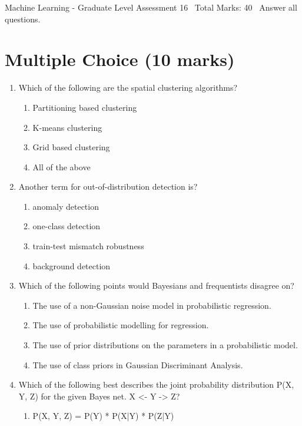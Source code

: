 \documentclass[12pt]{article}
\begin{document}
\begin{center}
Machine Learning - Graduate Level Assessment 16 \
Total Marks: 40 \
Answer all questions.
\end{center}

\section*{Multiple Choice (10 marks)}
\begin{enumerate}[label=\arabic*.]
\item Which of the following are the spatial clustering algorithms?
\begin{enumerate}[label=(\alph*)]
    \item Partitioning based clustering
    \item K-means clustering
    \item Grid based clustering
    \item All of the above
\end{enumerate}
\item Another term for out-of-distribution detection is?
\begin{enumerate}[label=(\alph*)]
    \item anomaly detection
    \item one-class detection
    \item train-test mismatch robustness
    \item background detection
\end{enumerate}
\item Which of the following points would Bayesians and frequentists disagree on?
\begin{enumerate}[label=(\alph*)]
    \item The use of a non-Gaussian noise model in probabilistic regression.
    \item The use of probabilistic modelling for regression.
    \item The use of prior distributions on the parameters in a probabilistic model.
    \item The use of class priors in Gaussian Discriminant Analysis.
\end{enumerate}
\item Which of the following best describes the joint probability distribution P(X, Y, Z) for the given Bayes net. X \textless{}- Y -\textgreater{} Z?
\begin{enumerate}[label=(\alph*)]
    \item P(X, Y, Z) = P(Y) * P(X|Y) * P(Z|Y)

\end{enumerate}
\end{enumerate}
\end{document}
